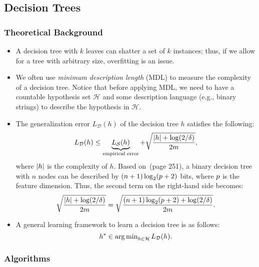 {\subsection{Decision Trees}
    \subsubsection{Theoretical Background}
    \begin{itemize}
        \item A decision tree with $k$ leaves can shatter a set of $k$ instances; thus, if we allow for a tree with arbitrary size, overfitting is an issue.
        \item We often use \emph{minimum description length} (MDL) to measure the complexity of a decision tree. Notice that before applying MDL, we need to have a countable hypothesis set $\mathcal{H}$ and some description language (e.g., binary strings) to describe the hypothesis in $\mathcal{H}$.
        \item The generalization error $L_\mathcal{D}(h)$ of the decision tree $h$ satisfies the following:
            \begin{equation}
                L_\mathcal{D}(h) \le \underbrace{L_\mathcal{S}(h)}_{\text{empirical error}} + \sqrt{\frac{| h | + \log(2/\delta)}{2m}},
            \end{equation}
        where $| h |$ is the complexity of $h$.
        Based on~\cite{shalev2014understanding}(page 251), a binary decision tree with $n$ nodes can be described by $(n+1)\log_2(p+2)$ bits, where $p$ is the feature dimension.
        Thus, the second term on the right-hand side becomes:
            \begin{equation}
                \sqrt{\frac{| h | + \log(2/\delta)}{2m}} = \sqrt{\frac{(n+1)\log_2(p+2) + \log(2/\delta)}{2m}}.
            \end{equation}
        \item A general learning framework to learn a decision tree is as follows:
            \begin{equation}
                h^\ast \in \operatorname{arg\,min}_{h \in \mathcal{H}} L_{\mathcal{D}}(h).
            \end{equation}
    \end{itemize}

    \subsubsection{Algorithms}
}
